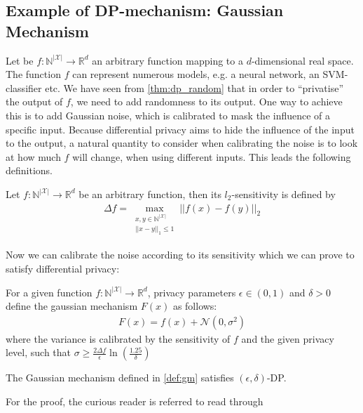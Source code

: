 \subsection{Example of DP-mechanism: Gaussian Mechanism}

Let be $f:\mathbb{N}^{|\mathcal{X}|} \longrightarrow \mathbb{R}^d$ an arbitrary function mapping to a $d$-dimensional real space. The function $f$ can represent numerous models, e.g. a neural network, an SVM-classifier etc. We have seen from \cref{thm:dp_random} that in order to ``privatise'' the output of $f$, we need to add randomness to its output. One way to achieve this is to add Gaussian noise, which is calibrated to mask the influence of a specific input. Because differential privacy aims to hide the influence of the input to the output, a natural quantity to consider when calibrating the noise is to look at how much $f$ will change, when using different inputs. This leads the following definitions.

\begin{definition}[$l_2$-sensitivity]
    Let $f:\mathbb{N}^{|\mathcal{X}|} \longrightarrow \mathbb{R}^d$ be an arbitrary function, then its $l_2$-sensitivity is defined by
    \begin{align}
        \Delta f = \max_{\substack{x,y \in \mathbb{N}^{|\mathcal{X}|} \\ ||x-y||_1\le 1}} ||f(x)-f(y)||_2 
    \end{align}
\end{definition}

Now we can calibrate the noise according to its sensitivity which we can prove to satisfy differential privacy:
\begin{definition}\label{def:gm} \label{def:gm}
    For a given function  $f:\mathbb{N}^{|\mathcal{X}|} \longrightarrow \mathbb{R}^d$, privacy parameters $\epsilon \in (0,1)$ and $\delta>0$ define the gaussian mechanism $F(x)$ as follows:
    \begin{align}
        F(x) = f(x) + \mathcal{N}(0, \sigma^2)
    \end{align}
    where the variance is calibrated by the sensitivity of $f$ and the given privacy level, such that $\sigma \ge \frac{2 \Delta f}{\epsilon}\ln(\frac{1.25}{\delta})$
\end{definition}

\begin{thm}
    The Gaussian mechanism defined in \cref{def:gm} satisfies $(\epsilon, \delta)$-DP.
\end{thm}
For the proof, the curious reader is referred to read through \parencite[][Appendix A]{dwork2014algorithmic}